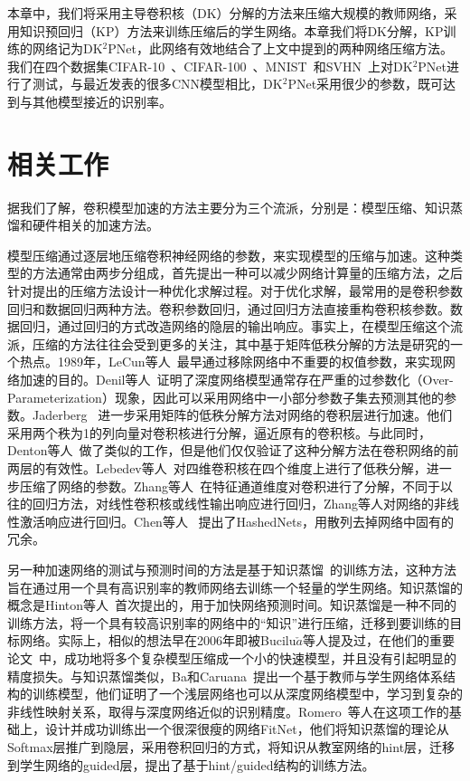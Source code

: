 本章中，我们将采用主导卷积核（DK）分解的方法来压缩大规模的教师网络，采用知识预回归（KP）方法来训练压缩后的学生网络。本章我们将DK分解，KP训练的网络记为DK$^2$PNet，此网络有效地结合了上文中提到的两种网络压缩方法。我们在四个数据集CIFAR-10~\cite{krizhevsky2009learning}、CIFAR-100~\cite{krizhevsky2009learning}、MNIST~\cite{lecun1998gradient}和SVHN~\cite{netzer2011reading}上对DK$^2$PNet进行了测试，与最近发表的很多CNN模型相比，DK$^2$PNet采用很少的参数，既可达到与其他模型接近的识别率。

\section{相关工作}
\label{sec:acc:relate}

据我们了解，卷积模型加速的方法主要分为三个流派，分别是：模型压缩、知识蒸馏和硬件相关的加速方法。

模型压缩通过逐层地压缩卷积神经网络的参数，来实现模型的压缩与加速。这种类型的方法通常由两步分组成，首先提出一种可以减少网络计算量的压缩方法，之后针对提出的压缩方法设计一种优化求解过程。对于优化求解，最常用的是卷积参数回归和数据回归两种方法。卷积参数回归，通过回归方法直接重构卷积核参数。数据回归，通过回归的方式改造网络的隐层的输出响应\cite{zhang2015efficient}。事实上，在模型压缩这个流派，压缩的方法往往会受到更多的关注，其中基于矩阵低秩分解的方法是研究的一个热点。1989年，LeCun等人~\cite{lecun1989optimal}最早通过移除网络中不重要的权值参数，来实现网络加速的目的。Denil等人~\cite{denil2013predicting}证明了深度网络模型通常存在严重的过参数化（Over-Parameterization）现象，因此可以采用网络中一小部分参数子集去预测其他的参数。Jaderberg~\cite{jaderberg2014speeding} 进一步采用矩阵的低秩分解方法对网络的卷积层进行加速。他们采用两个秩为1的列向量对卷积核进行分解，逼近原有的卷积核。与此同时，Denton等人~\cite{denton2014exploiting}做了类似的工作，但是他们仅仅验证了这种分解方法在卷积网络的前两层的有效性。Lebedev等人~\cite{lebedev2014speeding}对四维卷积核在四个维度上进行了低秩分解，进一步压缩了网络的参数。Zhang等人~\cite{zhang2015efficient}在特征通道维度对卷积进行了分解，不同于以往的回归方法，对线性卷积核或线性输出响应进行回归，Zhang等人对网络的非线性激活响应进行回归。Chen等人~\cite{chen2015compressing} 提出了HashedNets，用散列去掉网络中固有的冗余。

另一种加速网络的测试与预测时间的方法是基于知识蒸馏~\cite{hinton2015distilling}的训练方法，这种方法旨在通过用一个具有高识别率的教师网络去训练一个轻量的学生网络。知识蒸馏的概念是Hinton等人~\cite{hinton2015distilling}首次提出的，用于加快网络预测时间。知识蒸馏是一种不同的训练方法，将一个具有较高识别率的网络中的“知识”进行压缩，迁移到要训练的目标网络。实际上，相似的想法早在2006年即被Bucilu$\check{a}$等人提及过，在他们的重要论文~\cite{bucilu2006model}中，成功地将多个复杂模型压缩成一个小的快速模型，并且没有引起明显的精度损失。与知识蒸馏类似，Ba和Caruana~\cite{ba2014deep}提出一个基于教师与学生网络体系结构的训练模型，他们证明了一个浅层网络也可以从深度网络模型中，学习到复杂的非线性映射关系，取得与深度网络近似的识别精度。Romero~\cite{romero2014fitnets}等人在这项工作的基础上，设计并成功训练出一个很深很瘦的网络FitNet，他们将知识蒸馏的理论从Softmax层推广到隐层，采用卷积回归的方式，将知识从教室网络的hint层，迁移到学生网络的guided层，提出了基于hint/guided结构的训练方法。

